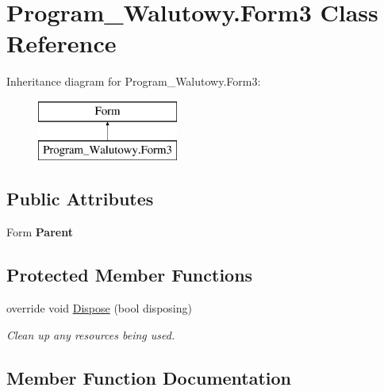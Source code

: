 \hypertarget{class_program___walutowy_1_1_form3}{}\section{Program\+\_\+\+Walutowy.\+Form3 Class Reference}
\label{class_program___walutowy_1_1_form3}
Inheritance diagram for Program\+\_\+\+Walutowy.\+Form3\+:\begin{figure}[H]
\begin{center}
\leavevmode
\includegraphics[height=2.000000cm]{class_program___walutowy_1_1_form3}
\end{center}
\end{figure}
\subsection*{Public Attributes}
\begin{DoxyCompactItemize}
\item 
\mbox{\label{class_program___walutowy_1_1_form3_a84c93ca63a0038ab62e385da80c862fb}} 
Form {\bfseries Parent}
\end{DoxyCompactItemize}
\subsection*{Protected Member Functions}
\begin{DoxyCompactItemize}
\item 
override void \mbox{\hyperlink{class_program___walutowy_1_1_form3_a67d0768960cb26e95ae3bf4fa92024ae}{Dispose}} (bool disposing)
\begin{DoxyCompactList}\small\item\em Clean up any resources being used. \end{DoxyCompactList}\end{DoxyCompactItemize}


\subsection{Member Function Documentation}
\mbox{\label{class_program___walutowy_1_1_form3_a67d0768960cb26e95ae3bf4fa92024ae}} 
